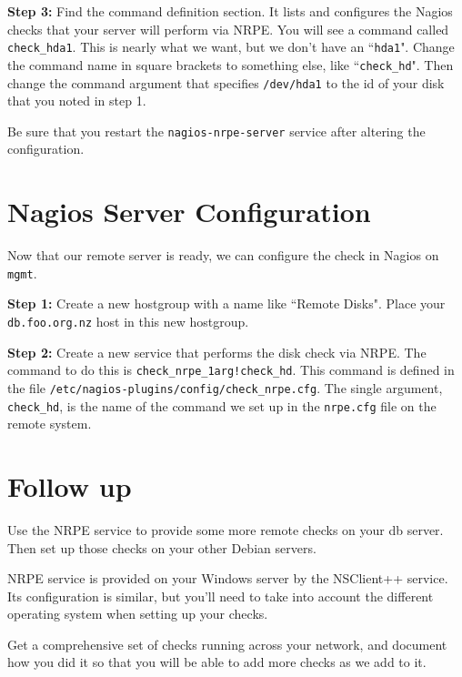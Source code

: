 \documentclass{article}   	%
\begin{document}
\textbf{Step 3:} Find the command definition section.  It lists and configures the Nagios checks that your server will perform via NRPE.  You will see a command called \texttt{check\_hda1}.  This is nearly what we want, but we don't have an ``\texttt{hda1}".  Change the command name in square brackets to something else, like ``\texttt{check\_hd}".  Then change the command argument that specifies \texttt{/dev/hda1} to the id of your disk that you noted in step 1.

Be sure that you restart the \texttt{nagios-nrpe-server} service after altering the configuration.

\section{Nagios Server Configuration}
Now that our remote server is ready, we can configure the check in Nagios on \texttt{mgmt}.

\textbf{Step 1:} Create a new hostgroup with a name like ``Remote Disks".  Place your \texttt{db.foo.org.nz} host in this new hostgroup.

\textbf{Step 2:}  Create a new service that performs the disk check via NRPE.  The command to do this is \texttt{check\_nrpe\_1arg!check\_hd}.  This command is defined in the file \texttt{/etc/nagios-plugins/config/check\_nrpe.cfg}.  The single argument, \texttt{check\_hd}, is the name of the command we set up in the \texttt{nrpe.cfg} file on the remote system.

\section{Follow up}
Use the NRPE service to provide some more remote checks on your db server.  Then set up those checks on your other Debian servers.

NRPE service is provided on your Windows server by the NSClient++ service.  Its configuration is similar, but you'll need to take into account the different operating system when setting up your checks.

Get a comprehensive set of checks running across your network, and document how you did it so that you will be able to add more checks as we add to it.
\end{document}

